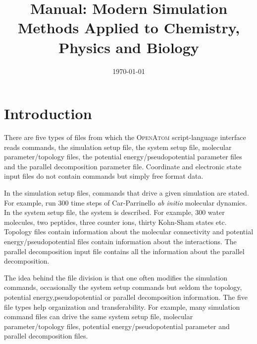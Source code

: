 \documentclass[12pt,titlepage]{article}
\title{\openatom Manual: Modern Simulation Methods Applied to Chemistry, Physics and Biology}
\date{\today}
\begin{document}
\maketitle
\tableofcontents
\newpage


\hrulefill
\section{\bf Introduction}

There are five types of files from which the \textsc{OpenAtom}
script-language interface reads commands, the
simulation setup file, the system setup file, molecular parameter/topology
files, the potential energy/pseudopotential parameter files and the
parallel decomposition parameter file. Coordinate and electronic state input files do 
not contain commands but simply free format data. 

In the simulation setup files, commands that drive a given simulation
are stated. For example, run 300 time steps of Car-Parrinello {\em ab initio}
molecular dynamics. In the system setup file, the 
system is described. For example, 300 water molecules, two peptides,
three counter ions, thirty Kohn-Sham states etc.  Topology files
contain information about the molecular connectivity and potential
energy/pseudopotential files contain information about the
interactions. The parallel decomposition
input file contains all the information about the parallel decomposition.

The idea behind the file division is that one often modifies the
simulation commands, occasionally the system setup commands but seldom the 
topology, potential energy,pseudopotential or parallel decomposition
information. 
The five file types help organization and transferability. For
example, many simulation command files can drive the same system setup file, 
molecular parameter/topology files, potential energy/pseudopotential
parameter and parallel decomposition files.
\end{document}
